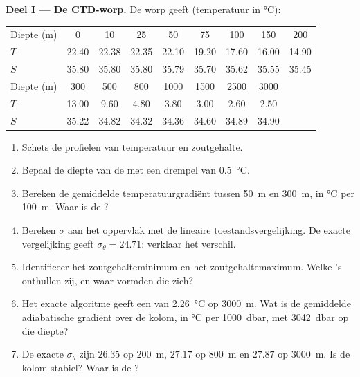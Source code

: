 \begin{problem}
\medskip
\noindent\textbf{Deel I --- De CTD-worp.} De worp geeft (temperatuur in \si{\celsius}):
\begin{center}
\small
\setlength{\tabcolsep}{3pt}
\begin{tabular}{|l|*{8}{c}|}
\hline
Diepte (m) & 0 & 10 & 25 & 50 & 75 & 100 & 150 & 200 \\
$T$ & 22.40 & 22.38 & 22.35 & 22.10 & 19.20 & 17.60 & 16.00 & 14.90 \\
$S$ & 35.80 & 35.80 & 35.80 & 35.79 & 35.70 & 35.62 & 35.55 & 35.45 \\
\hline
Diepte (m) & 300 & 500 & 800 & 1000 & 1500 & 2500 & 3000 & \\
$T$ & 13.00 & 9.60 & 4.80 & 3.80 & 3.00 & 2.60 & 2.50 & \\
$S$ & 35.22 & 34.82 & 34.32 & 34.36 & 34.60 & 34.89 & 34.90 & \\
\hline
\end{tabular}
\end{center}
\begin{enumerate}
  \item Schets de profielen van temperatuur en zoutgehalte.
  \item Bepaal de diepte van de  met een drempel van \qty{0.5}{\celsius}.
  \item Bereken de gemiddelde temperatuurgradiënt tussen \qty{50}{m} en
        \qty{300}{m}, in \si{\celsius} per \qty{100}{m}. Waar is de ?
  \item Bereken $\sigma$ aan het oppervlak met de lineaire toestandsvergelijking. De exacte vergelijking geeft $\sigma_\theta = 24.71$: verklaar het verschil.
  \item Identificeer het zoutgehalteminimum en het zoutgehaltemaximum. Welke 's onthullen zij, en waar vormden die zich?
  \item Het exacte algoritme geeft een  van
        \qty{2.26}{\celsius} op \qty{3000}{m}. Wat is de gemiddelde adiabatische
        gradiënt over de kolom, in \si{\celsius} per \qty{1000}{dbar}, met
        \qty{3042}{dbar} op die diepte?
  \item De exacte $\sigma_\theta$ zijn $26.35$ op \qty{200}{m}, $27.17$ op
        \qty{800}{m} en $27.87$ op \qty{3000}{m}. Is de kolom stabiel? Waar is de ?
\end{enumerate}


\end{problem}
